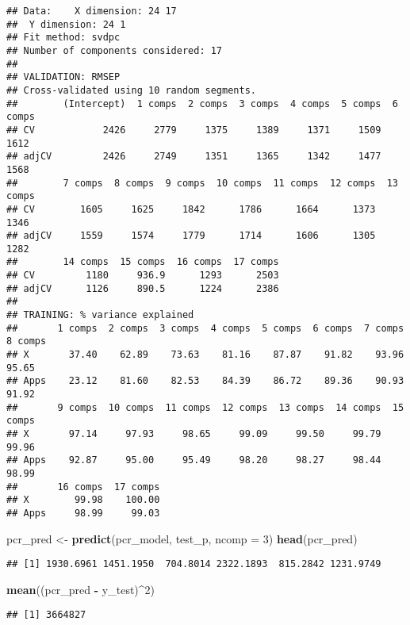 \documentclass[
  ignorenonframetext,
]{beamer}
\newenvironment{Shaded}{\begin{snugshade}}{\end{snugshade}}
\newcommand{\DataTypeTok}[1]{\textcolor[rgb]{0.13,0.29,0.53}{#1}}
\newcommand{\DecValTok}[1]{\textcolor[rgb]{0.00,0.00,0.81}{#1}}
\newcommand{\KeywordTok}[1]{\textcolor[rgb]{0.13,0.29,0.53}{\textbf{#1}}}
\newcommand{\NormalTok}[1]{#1}
\newcommand{\OperatorTok}[1]{\textcolor[rgb]{0.81,0.36,0.00}{\textbf{#1}}}
\newcommand{\StringTok}[1]{\textcolor[rgb]{0.31,0.60,0.02}{#1}}
\begin{document}
\begin{frame}[fragile]
\begin{verbatim}
## Data:    X dimension: 24 17 
##  Y dimension: 24 1
## Fit method: svdpc
## Number of components considered: 17
## 
## VALIDATION: RMSEP
## Cross-validated using 10 random segments.
##        (Intercept)  1 comps  2 comps  3 comps  4 comps  5 comps  6 comps
## CV            2426     2779     1375     1389     1371     1509     1612
## adjCV         2426     2749     1351     1365     1342     1477     1568
##        7 comps  8 comps  9 comps  10 comps  11 comps  12 comps  13 comps
## CV        1605     1625     1842      1786      1664      1373      1346
## adjCV     1559     1574     1779      1714      1606      1305      1282
##        14 comps  15 comps  16 comps  17 comps
## CV         1180     936.9      1293      2503
## adjCV      1126     890.5      1224      2386
## 
## TRAINING: % variance explained
##       1 comps  2 comps  3 comps  4 comps  5 comps  6 comps  7 comps  8 comps
## X       37.40    62.89    73.63    81.16    87.87    91.82    93.96    95.65
## Apps    23.12    81.60    82.53    84.39    86.72    89.36    90.93    91.92
##       9 comps  10 comps  11 comps  12 comps  13 comps  14 comps  15 comps
## X       97.14     97.93     98.65     99.09     99.50     99.79     99.96
## Apps    92.87     95.00     95.49     98.20     98.27     98.44     98.99
##       16 comps  17 comps
## X        99.98    100.00
## Apps     98.99     99.03
\end{verbatim}

\begin{Shaded}
\begin{Highlighting}[]
\NormalTok{pcr_pred <-}\StringTok{ }\KeywordTok{predict}\NormalTok{(pcr_model, test_p, }\DataTypeTok{ncomp =} \DecValTok{3}\NormalTok{)}
\KeywordTok{head}\NormalTok{(pcr_pred)}
\end{Highlighting}
\end{Shaded}

\begin{verbatim}
## [1] 1930.6961 1451.1950  704.8014 2322.1893  815.2842 1231.9749
\end{verbatim}

\begin{Shaded}
\begin{Highlighting}[]
\KeywordTok{mean}\NormalTok{((pcr_pred }\OperatorTok{-}\StringTok{ }\NormalTok{y_test)}\OperatorTok{^}\DecValTok{2}\NormalTok{)}
\end{Highlighting}
\end{Shaded}

\begin{verbatim}
## [1] 3664827
\end{verbatim}

\end{frame}
\end{document}
